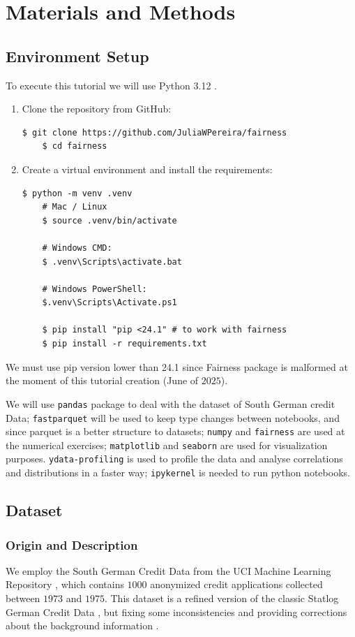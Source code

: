 \section{Materials and Methods}
\subsection{Environment Setup}
To execute this tutorial we will use Python 3.12 \cite{python_download}.

\begin{enumerate}
\item Clone the repository from GitHub:
    \begin{lstlisting}[style=terminal]
    $ git clone https://github.com/JuliaWPereira/fairness
    $ cd fairness
    \end{lstlisting}
\item Create a virtual environment and install the requirements:
    \begin{lstlisting}[style=terminal]
    $ python -m venv .venv
    # Mac / Linux
    $ source .venv/bin/activate

    # Windows CMD:
    $ .venv\Scripts\activate.bat

    # Windows PowerShell:
    $.venv\Scripts\Activate.ps1

    $ pip install "pip <24.1" # to work with fairness
    $ pip install -r requirements.txt
    \end{lstlisting}
\end{enumerate}

We must use pip version lower than 24.1 since Fairness package is malformed at the moment of this tutorial creation (June of $2025$).

We will use \texttt{pandas} package to deal with the dataset of South German credit Data; \texttt{fastparquet} will be used to keep type changes between notebooks, and since parquet is a better structure to datasets; \texttt{numpy} and \texttt{fairness} are used at the numerical exercises; \texttt{matplotlib} and \texttt{seaborn} are used for visualization purposes. \texttt{ydata-profiling} is used to profile the data and analyse correlations and distributions in a faster way; \texttt{ipykernel} is needed to run python notebooks.

\subsection{Dataset}
\subsubsection{Origin and Description}
We employ the South German Credit Data from the UCI Machine Learning Repository \cite{south_2019}, which contains $1000$ anonymized credit applications collected between $1973$ and $1975$. This dataset is a refined version of the classic Statlog German Credit Data \cite{hofmann_statlog_1994}, but fixing some inconsistencies and providing corrections about the background information \cite{south_2019}.

